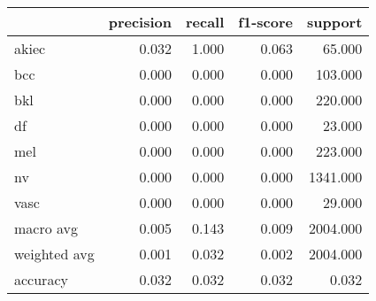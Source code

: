 \begin{tabular}{lrrrr}
\toprule
 & precision & recall & f1-score & support \\
\midrule
akiec & 0.032 & 1.000 & 0.063 & 65.000 \\
bcc & 0.000 & 0.000 & 0.000 & 103.000 \\
bkl & 0.000 & 0.000 & 0.000 & 220.000 \\
df & 0.000 & 0.000 & 0.000 & 23.000 \\
mel & 0.000 & 0.000 & 0.000 & 223.000 \\
nv & 0.000 & 0.000 & 0.000 & 1341.000 \\
vasc & 0.000 & 0.000 & 0.000 & 29.000 \\
macro avg & 0.005 & 0.143 & 0.009 & 2004.000 \\
weighted avg & 0.001 & 0.032 & 0.002 & 2004.000 \\
accuracy & 0.032 & 0.032 & 0.032 & 0.032 \\
\bottomrule
\end{tabular}
